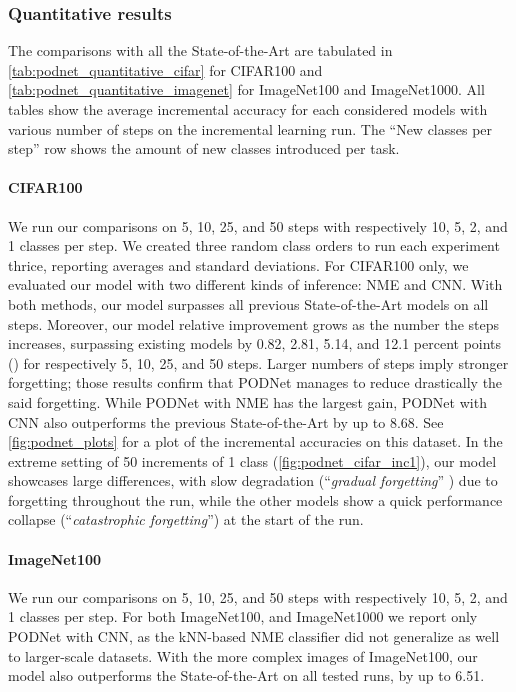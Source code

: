 




\subsubsection{Quantitative results}
\label{sec:podnet_quantitative_results}

The comparisons with all the State-of-the-Art are tabulated in
\autoref{tab:podnet_quantitative_cifar} for CIFAR100 and \autoref{tab:podnet_quantitative_imagenet}
for ImageNet100 and ImageNet1000. All tables show the average incremental accuracy for each
considered models with various number of steps on the incremental learning run. The ``New classes
per step'' row shows the amount of new classes introduced per task.

\paragraph{CIFAR100} We run our comparisons on 5, 10, 25, and 50 steps with respectively 10, 5, 2,
and 1 classes per step. We created three random class orders to run each experiment thrice,
reporting averages and standard deviations. For CIFAR100 only, we evaluated our model with two
different kinds of inference: \ac{NME} and CNN. With both methods, our model surpasses all previous
State-of-the-Art models on all steps. Moreover, our model relative improvement grows as the number
the steps increases, surpassing existing models by 0.82, 2.81, 5.14, and 12.1 percent points (\pp)
for respectively 5, 10, 25, and 50 steps. Larger numbers of steps imply  stronger forgetting; those
results confirm that \ac{PODNet} manages to reduce drastically the said forgetting. While
\ac{PODNet} with \ac{NME} has the largest gain, \ac{PODNet} with CNN also outperforms the previous
State-of-the-Art by up to 8.68\pp. See \autoref{fig:podnet_plots} for a plot of the incremental
accuracies on this dataset. In the extreme setting of 50 increments of 1 class
(\autoref{fig:podnet_cifar_inc1}), our model showcases large differences, with slow degradation
(``\textit{gradual forgetting}'' \citep{french1999catastrophicforgetting}) due to forgetting
throughout the run, while the other models show a quick performance collapse (``\textit{catastrophic
    forgetting}'') at the start of the run.

\paragraph{ImageNet100} We run our comparisons on 5, 10, 25, and 50 steps with respectively 10, 5,
2, and 1 classes per step. For both ImageNet100, and ImageNet1000 we report only \ac{PODNet} with
CNN, as the kNN-based \ac{NME} classifier did not generalize as well to larger-scale datasets. With
the more complex images of ImageNet100, our model also outperforms the State-of-the-Art on all
tested runs, by up to 6.51\pp.

